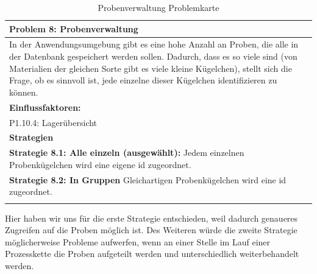 \documentclass[enabledeprecatedfontcommands,fontsize=12pt,paper=a4,twoside]{scrartcl}
\begin{document}
\begin{table}[H]
    \centering
    \begin{tabular}{|p{15cm}|}
    \hline
          \textbf{Problem 8:} Probenverwaltung
          \\ \hline
         In der Anwendungsumgebung gibt es eine hohe Anzahl an Proben, die alle in der Datenbank gespeichert werden sollen. Dadurch, dass es so viele sind (von Materialien der gleichen Sorte gibt es viele kleine Kügelchen), stellt sich die Frage, ob es sinnvoll ist, jede einzelne dieser Kügelchen identifizieren zu können.
          \\ \hline
          \textbf{Einflussfaktoren: } \\
          P1.10.4: Lagerübersicht \\
          \hline
          \textbf{Strategien} \\ \hline
            {}          
           \label{strategie:8.1}     
	\textbf{Strategie 8.1: Alle einzeln (ausgewählt):} Jedem einzelnen Probenkügelchen wird eine eigene id zugeordnet. \\
	  {}          
           \label{strategie:8.2}     
	\textbf{Strategie 8.2: In Gruppen} Gleichartigen Probenkügelchen wird eine id zugeordnet. \\
          \\ \hline
    \end{tabular}
    \caption{Probenverwaltung Problemkarte}
    \label{tab:ProblemKarte8}
\end{table}
Hier haben wir uns für die erste Strategie entschieden, weil dadurch genaueres Zugreifen auf die Proben möglich ist. Des Weiteren würde die zweite Strategie möglicherweise Probleme aufwerfen, wenn an einer Stelle im Lauf einer Prozesskette die Proben aufgeteilt werden und unterschiedlich weiterbehandelt werden. \\
\end{document}
